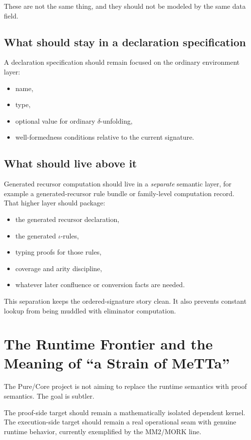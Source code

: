 \documentclass[11pt]{article}
\newcommand{\MeTTa}{\textup{MeTTa}}
\newcommand{\MORK}{\textup{MORK}}
\newcommand{\MMTwo}{\textup{MM2}}
\newcommand{\deltared}{\ensuremath{\delta}}
\newcommand{\iotared}{\ensuremath{\iota}}
\begin{document}
These are not the same thing, and they should not be modeled by the same data
field.

\subsection{What should stay in a declaration specification}

A declaration specification should remain focused on the ordinary environment
layer:
\begin{itemize}[leftmargin=2em]
  \item name,
  \item type,
  \item optional value for ordinary $\deltared$-unfolding,
  \item well-formedness conditions relative to the current signature.
\end{itemize}

\subsection{What should live above it}

Generated recursor computation should live in a \emph{separate} semantic layer,
for example a generated-recursor rule bundle or family-level computation record.
That higher layer should package:
\begin{itemize}[leftmargin=2em]
  \item the generated recursor declaration,
  \item the generated $\iotared$-rules,
  \item typing proofs for those rules,
  \item coverage and arity discipline,
  \item whatever later confluence or conversion facts are needed.
\end{itemize}

This separation keeps the ordered-signature story clean. It also prevents
constant lookup from being muddled with eliminator computation.

\section{The Runtime Frontier and the Meaning of ``a Strain of \MeTTa{}''}

The Pure/Core project is not aiming to replace the runtime semantics with proof
semantics. The goal is subtler.

The proof-side target should remain a mathematically isolated dependent kernel.
The execution-side target should remain a real operational seam with genuine
runtime behavior, currently exemplified by the \MMTwo{}/\MORK{} line.
\end{document}
